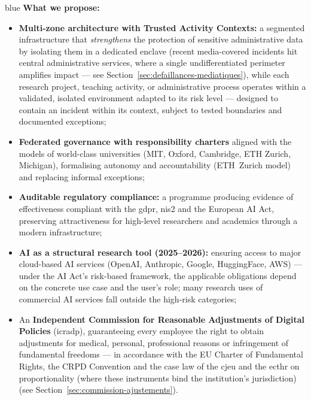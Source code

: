 \begin{stakeholderbox}{blue}
\medskip
\textbf{What we propose:}
\begin{itemize}[nosep]
    \item \textbf{Multi-zone architecture with Trusted Activity
    Contexts:} a segmented infrastructure that \emph{strengthens}
    the protection of sensitive administrative data by isolating
    them in a dedicated enclave (recent media-covered incidents hit
    central administrative services, where a single undifferentiated
    perimeter amplifies impact --- see
    Section~\ref{sec:defaillances-mediatiques}),
    while each research project, teaching activity, or
    administrative process operates within a validated, isolated
    environment adapted to its risk level --- designed to contain
    an incident within its context, subject to tested boundaries
    and documented exceptions;
    \item \textbf{Federated governance with responsibility charters}
    aligned with the models of world-class universities (MIT,
    Oxford, Cambridge, ETH Zurich, Michigan), formalising autonomy
    and accountability (ETH~Zurich model) and replacing informal
    exceptions;
    \item \textbf{Auditable regulatory compliance:} a programme
    producing evidence of effectiveness compliant with the
    \gls{gdpr}, \gls{nis2} and the European AI Act, preserving
    attractiveness for high-level researchers and academics
    through a modern infrastructure;
    \item \textbf{AI as a structural research tool (2025--2026):}
    ensuring access to major cloud-based AI services (OpenAI,
    Anthropic, Google, HuggingFace, AWS) --- under the AI Act's
    risk-based framework, the applicable obligations depend on
    the concrete use case and the user's role; many research
    uses of commercial AI services fall outside the high-risk
    categories;
    \item An \textbf{Independent Commission for Reasonable
    Adjustments of Digital Policies} (\gls{icradp}), guaranteeing
    every employee the right to obtain adjustments for medical,
    personal, professional reasons or infringement of fundamental
    freedoms --- in accordance with the EU Charter of Fundamental
    Rights, the CRPD Convention and the case law of the \gls{cjeu}
    and the \gls{ecthr} on proportionality (where these instruments
    bind the institution's jurisdiction)
    (see Section~\ref{sec:commission-ajustements}).
\end{itemize}


\end{stakeholderbox}
